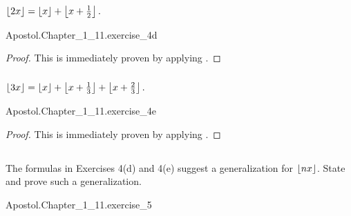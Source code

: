\documentclass{report}
\begin{document}
\subsubsection{}%

  $\left\lfloor2x\right\rfloor = \left\lfloor x\right\rfloor + \left\lfloor x + \frac{1}{2}\right\rfloor.$

    {Apostol.Chapter\_1\_11.exercise\_4d}

  \begin{proof}
    This is immediately proven by applying .
  \end{proof}

\subsubsection{}%

  $\left\lfloor3x\right\rfloor = \left\lfloor x\right\rfloor + \left\lfloor x + \frac{1}{3}\right\rfloor + \left\lfloor x + \frac{2}{3}\right\rfloor.$

    {Apostol.Chapter\_1\_11.exercise\_4e}

  \begin{proof}
    This is immediately proven by applying .
  \end{proof}

\subsection{}%

  The formulas in Exercises 4(d) and 4(e) suggest a generalization for
    $\left\lfloor nx\right\rfloor$.
  State and prove such a generalization.

    {Apostol.Chapter\_1\_11.exercise\_5}
\end{document}
